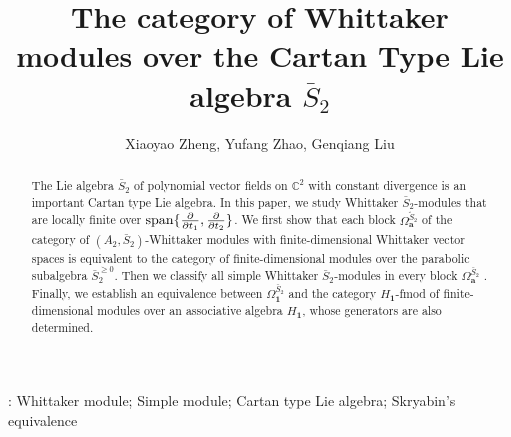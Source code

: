 \documentclass[12pt,a4paper]{amsart}
\begin{document}
\title[Whittaker category]{The category of  Whittaker modules over the Cartan Type Lie algebra $\bar{S}_2$}

\author{Xiaoyao Zheng, Yufang Zhao, Genqiang Liu}





\date{}
\maketitle


\begin{abstract}
The  Lie algebra $\bar{S}_2$  of polynomial vector fields on $\mathbb{C}^2$  with constant divergence is an important Cartan type Lie algebra.
 In this paper, we study Whittaker $\bar{S}_2$-modules that are locally finite
 over $\textup{span}\{\frac{\partial}{\partial t_1}, \frac{\partial}{\partial t_2}\}$.
 We first show that each block $\Omega^{\widetilde{S}_2}_{\mathbf{a}}$ of the category of $(A_2, \bar{S}_2)$-Whittaker modules with finite-dimensional Whittaker vector spaces is equivalent to the category of finite-dimensional modules over the parabolic subalgebra $\bar{S}_2^{\geq 0}$. Then we classify all simple  Whittaker $\bar{S}_2$-modules in every block $\Omega^{\bar{S}_2}_{\mathbf{a}}$ . Finally, we establish an equivalence between  $\Omega^{\bar{S}_2}_{\mathbf{1}}$ and the category $H_{\mathbf{1}}$-fmod of finite-dimensional modules over an associative algebra
$H_{\mathbf{1}}$, whose generators are also determined. 
\end{abstract}




: Whittaker module; Simple module; Cartan type Lie algebra; Skryabin's equivalence
\end{document}
